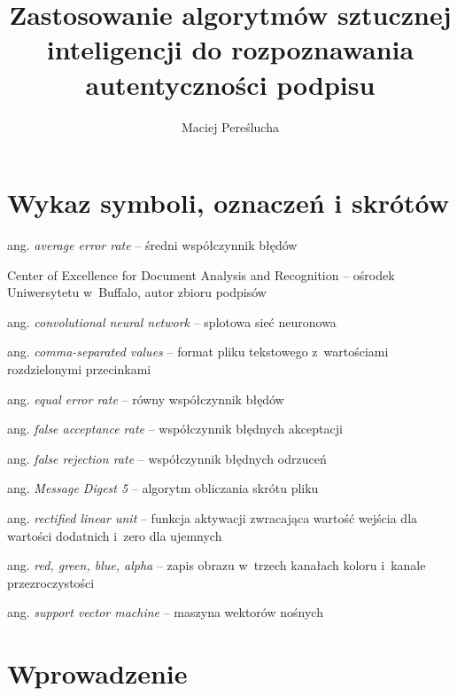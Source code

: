 \documentclass[12pt, twoside, openright]{article}
\author{Maciej Pereślucha}
\title{Zastosowanie algorytmów sztucznej inteligencji do rozpoznawania autentyczności podpisu}
\begin{document}
\maketitle
\cleardoublepage

\tableofcontents
\cleardoublepage


\section*{Wykaz symboli, oznaczeń i skrótów}

\begin{description}[leftmargin=2.5cm, labelwidth=2cm, labelsep=0.5cm, font=\normalfont]
	\item[AER] ang. \textit{average error rate} -- średni współczynnik błędów
	\item[CEDAR] Center of Excellence for Document Analysis and Recognition -- ośrodek Uniwersytetu w~Buffalo, autor zbioru podpisów
	\item[CNN] ang. \textit{convolutional neural network} -- splotowa sieć neuronowa	
	\item[CSV] ang. \textit{comma-separated values} -- format pliku tekstowego z~wartościami rozdzielonymi przecinkami
	\item[EER] ang. \textit{equal error rate} -- równy współczynnik błędów
	\item[FAR] ang. \textit{false acceptance rate} -- współczynnik błędnych akceptacji
	\item[FRR] ang. \textit{false rejection rate} -- współczynnik błędnych odrzuceń
	\item[MD5] ang. \textit{Message Digest 5} -- algorytm obliczania skrótu pliku
	\item[ReLU] ang. \textit{rectified linear unit} -- funkcja aktywacji zwracająca wartość wejścia dla wartości dodatnich i~zero dla ujemnych
	\item[RGBA] ang. \textit{red, green, blue, alpha} -- zapis obrazu w~trzech kanałach koloru i~kanale przezroczystości
	\item[SVM] ang. \textit{support vector machine} -- maszyna wektorów nośnych
\end{description}

\cleardoublepage


\section{Wprowadzenie}
\label{Sec:wprowadzenie}
\end{document}
